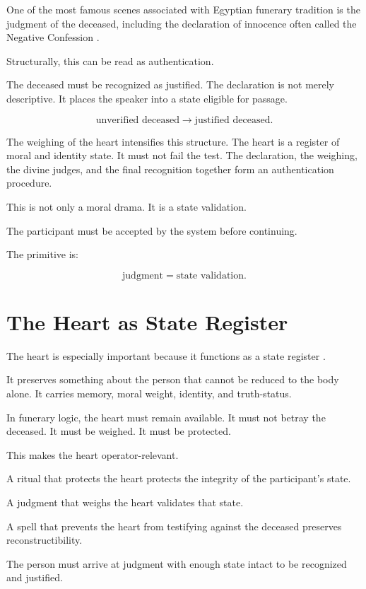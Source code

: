 \documentclass[11pt]{book}
\begin{document}
One of the most famous scenes associated with Egyptian funerary tradition is the judgment of the deceased, including the declaration of innocence often called the Negative Confession \cite{Allen1974BookDead,Faulkner1972BookDead,Assmann2005DeathSalvation}.

Structurally, this can be read as authentication.

The deceased must be recognized as justified. The declaration is not merely descriptive. It places the speaker into a state eligible for passage.

\[
\text{unverified deceased} \rightarrow \text{justified deceased}.
\]

The weighing of the heart intensifies this structure. The heart is a register of moral and identity state. It must not fail the test. The declaration, the weighing, the divine judges, and the final recognition together form an authentication procedure.

This is not only a moral drama. It is a state validation.

The participant must be accepted by the system before continuing.

The primitive is:

\[
\text{judgment} = \text{state validation}.
\]

\section{The Heart as State Register}

The heart is especially important because it functions as a state register \cite{Allen1974BookDead,Faulkner1972BookDead,Assmann2005DeathSalvation}.

It preserves something about the person that cannot be reduced to the body alone. It carries memory, moral weight, identity, and truth-status.

In funerary logic, the heart must remain available. It must not betray the deceased. It must be weighed. It must be protected.

This makes the heart operator-relevant.

A ritual that protects the heart protects the integrity of the participant's state.

A judgment that weighs the heart validates that state.

A spell that prevents the heart from testifying against the deceased preserves reconstructibility.

The person must arrive at judgment with enough state intact to be recognized and justified.
\end{document}

